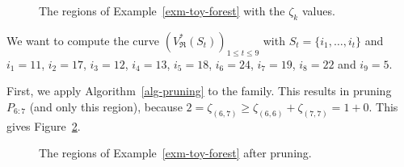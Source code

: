 \documentclass[
  11pt,
  a4paper,
]{article}
\theoremstyle{plain}
\theoremstyle{definition}
\theoremstyle{plain}
\theoremstyle{definition}
\theoremstyle{plain}
\theoremstyle{remark}
\begin{document}
\begin{figure}


\caption{\label{fig-zetas}The regions of Example~\ref{exm-toy-forest}
with the \(\zeta_k\) values.}

\end{figure}%

We want to compute the curve
\(\left(V^*_{\mathfrak{R}}\left(S_t\right)\right)_{1\leq t\leq 9}\) with
\(S_t=\{i_1,\dotsc, i_t\}\) and \(i_1=11\), \(i_2=17\), \(i_3=12\),
\(i_4=13\), \(i_5=18\), \(i_6=24\), \(i_7=19\), \(i_8=22\) and
\(i_9=5\).

First, we apply  Algorithm~\ref{alg-pruning}  to the family. This
results in pruning \(P_{6:7}\) (and only this region), because
\(2=\zeta_{(6, 7)}\geq \zeta_{(6, 6)}+\zeta_{(7, 7)}=1+0\). This gives
Figure~\ref{fig-pruned}.

\begin{figure}


\caption{\label{fig-pruned}The regions of Example~\ref{exm-toy-forest}
after pruning.}

\end{figure}%
\end{document}
